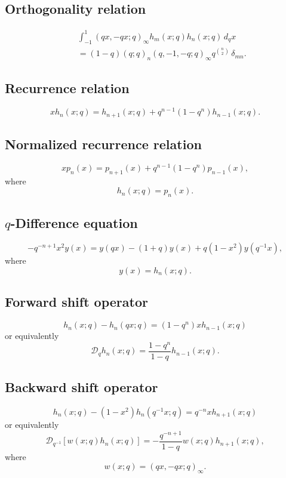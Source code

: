 \documentclass[envcountchap,graybox]{svmono}
\begin{document}
{{\subsection*{Orthogonality relation}
\begin{eqnarray}
\label{OrtDiscreteqHermiteI}
& &\int_{-1}^1(qx,-qx;q)_{\infty}h_m(x;q)h_n(x;q)\,d_qx\nonumber\\
& &{}=(1-q)(q;q)_n(q,-1,-q;q)_{\infty}q^{\binom{n}{2}}\,\delta_{mn}.
\end{eqnarray}

\subsection*{Recurrence relation}
\begin{equation}
\label{RecDiscreteqHermiteI}
xh_n(x;q)=h_{n+1}(x;q)+q^{n-1}(1-q^n)h_{n-1}(x;q).
\end{equation}

\subsection*{Normalized recurrence relation}
\begin{equation}
\label{NormRecDiscreteqHermiteI}
xp_n(x)=p_{n+1}(x)+q^{n-1}(1-q^n)p_{n-1}(x),
\end{equation}
where
$$h_n(x;q)=p_n(x).$$

\subsection*{$q$-Difference equation}
\begin{equation}
\label{dvDiscreteqHermiteI}
-q^{-n+1}x^2y(x)=y(qx)-(1+q)y(x)+q(1-x^2)y(q^{-1}x),
\end{equation}
where
$$y(x)=h_n(x;q).$$

\subsection*{Forward shift operator}
\begin{equation}
\label{shift1DiscreteqHermiteI-I}
h_n(x;q)-h_n(qx;q)=(1-q^n)xh_{n-1}(x;q)
\end{equation}
or equivalently
\begin{equation}
\label{shift1DiscreteqHermiteI-II}
\mathcal{D}_qh_n(x;q)=\frac{1-q^n}{1-q}h_{n-1}(x;q).
\end{equation}

\subsection*{Backward shift operator}
\begin{equation}
\label{shift2DiscreteqHermiteI-I}
h_n(x;q)-(1-x^2)h_n(q^{-1}x;q)=q^{-n}xh_{n+1}(x;q)
\end{equation}
or equivalently
\begin{equation}
\label{shift2DiscreteqHermiteI-II}
\mathcal{D}_{q^{-1}}\left[w(x;q)h_n(x;q)\right]
=-\frac{q^{-n+1}}{1-q}w(x;q)h_{n+1}(x;q),
\end{equation}
where
$$w(x;q)=(qx,-qx;q)_{\infty}.$$

}}
\end{document}

